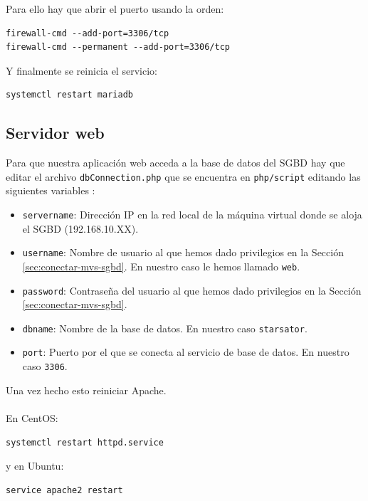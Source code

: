 Para ello hay que abrir el puerto usando la orden:

\begin{lstlisting}
firewall-cmd --add-port=3306/tcp 
firewall-cmd --permanent --add-port=3306/tcp
\end{lstlisting}

Y finalmente se reinicia el servicio: 

\begin{lstlisting}
systemctl restart mariadb
\end{lstlisting}

\subsection{Servidor web}

Para que nuestra aplicación web acceda a la base de datos del SGBD hay que editar el archivo \texttt{dbConnection.php} que se encuentra en \texttt{php/script} editando las siguientes variables \cite{PHPRemoteMySQLConnection}:

\begin{itemize}
	\item \texttt{servername}: Dirección IP en la red local de la máquina virtual donde se aloja el SGBD (192.168.10.XX).
	\item \texttt{username}: Nombre de usuario al que hemos dado privilegios en la Sección \ref{sec:conectar-mvs-sgbd}. En nuestro caso le hemos llamado \texttt{web}.
	\item \texttt{password}: Contraseña del usuario al que hemos dado privilegios en la Sección \ref{sec:conectar-mvs-sgbd}.
	\item \texttt{dbname}: Nombre de la base de datos. En nuestro caso \texttt{starsator}.
	\item \texttt{port}: Puerto por el que se conecta al servicio de base de datos. En nuestro caso \texttt{3306}.
\end{itemize}

Una vez hecho esto reiniciar Apache. 
\\ \\
En CentOS:

\begin{lstlisting}
systemctl restart httpd.service
\end{lstlisting}

y en Ubuntu:

\begin{lstlisting}
service apache2 restart
\end{lstlisting}

